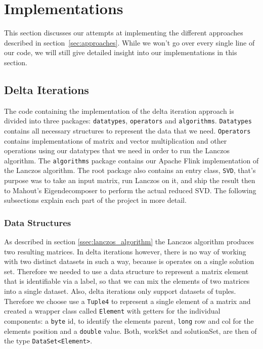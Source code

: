 \section{Implementations}


This section discusses our attempts at implementing the different approaches
described in section~\ref{sec:approaches}. While we won't go over every single
line of our code, we will still give detailed insight into our implementations
in this section.

\subsection{Delta Iterations}

The code containing the implementation of the delta iteration approach is
divided into three packages: \texttt{datatypes}, \texttt{operators} and
\texttt{algorithms}. \texttt{Datatypes} contains all necessary structures to
represent the data that we need. \texttt{Operators} contains implementations of
matrix and vector multiplication and other operations using our datatypes that
we need in order to run the Lanczos algorithm. The \texttt{algorithms} package
contains our Apache Flink implementation of the Lanczos algorithm. The root
package also contains an entry class, \texttt{SVD}, that's purpose was to take
an input matrix, run Lanczos on it, and ship the result then to Mahout's
Eigendecomposer to perform the actual reduced SVD. The following subsections
explain each part of the project in more detail.

\subsubsection{Data Structures}
As described in section \ref{ssec:lanczos_algorithm} the Lanczos algorithm
produces two resulting matrices. In delta iterations however, there is no way
of working with two distinct datasets in such a way, because is operates on a
single solution set. Therefore we needed to use a data structure to represent a
matrix element that is identifiable via a label, so that we can mix the
elements of two matrices into a single dataset. Also, delta iterations only
support datasets of tuples. Therefore we choose use a \texttt{Tuple4} to
represent a single element of a matrix and created a wrapper class called
\texttt{Element} with getters for the individual components: a \texttt{byte}
id, to identify the elements parent, \texttt{long} row and col for the elements
position and a \texttt{double} value. Both, workSet and solutionSet, are then
of the type \texttt{DataSet<Element>}.

